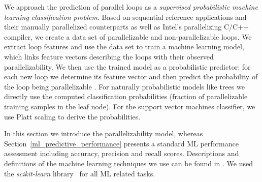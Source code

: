 
We approach the prediction of parallel loops as a \emph{supervised probabilistic machine learning classification problem}. Based on sequential reference applications and their manually parallelized counterparts as well as Intel's parallelizing C/C++ compiler, we create a data set of parallelizable and non-parallelizable loops. We extract loop features and use the data set to train a machine learning model, which links feature vectors describing the loops with their observed parallelizability. We then use the trained model as a probabilistic predictor: for each new loop we determine its feature vector and then predict the probability of the loop being parallelizable \cite{Niculescu-Mizil:2005:PGP:1102351.1102430}. For naturally probabilistic models like trees we directly use the computed classification probabilities (fraction of parallelizable training samples in the leaf node). For the support vector machines classifier, we use Platt scaling to derive the probabilities.

In this section we introduce the parallelizability model, whereas Section~\ref{ml_predictive_performance} presents a standard ML performance assessment including accuracy, precision and recall scores. Descriptions and definitions of the machine learning techniques we use can be found in \cite{James:2013:ISL:2517747}. We used the \textit{scikit-learn} library~\cite{scikit-learn} for all ML related tasks.


